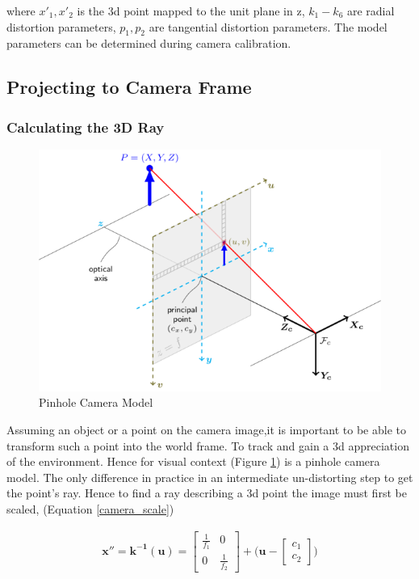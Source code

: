 \documentclass[a4paper,11pt,notitlepage]{article}
\begin{document}
where $x'_{1},x'_{2}$ is the 3d point mapped to the unit plane in z, $k_{1}-k_{6}$ are radial distortion parameters, $p_{1},p_{2}$ are tangential distortion parameters. The model parameters can be determined during camera calibration.

\subsection{Projecting to Camera Frame}

\subsubsection{Calculating the 3D Ray}

\noindent \begin{figure}[h!]
	\includegraphics[width = 1.0\hsize]{figures/pinhole_camera_model.png}
	\caption{Pinhole Camera Model}
	\label{pinhole_model}
\end{figure}

Assuming an object or a point on the camera image,it is important to be able to transform such a point into the world frame. To track and gain a 3d appreciation of the environment. Hence for visual context (Figure \ref{pinhole_model}) is a pinhole camera model. The only difference in practice in an intermediate un-distorting step to get the point's ray. Hence to find a ray describing a 3d point the image must first be scaled, (Equation \ref{camera_scale})


\begin{equation}
\begin{aligned}
\mathbf{x''} = \mathbf{k^{-1}(u)} = 
\begin{bmatrix}
\frac{1}{f_{1}} & 0 \\[0.3em]
0 & \frac{1}{f_{2}}
\end{bmatrix}
+ 
\bigg (
\mathbf{u} -
\begin{bmatrix}
c_{1} \\[0.3em]
c_{2}
\end{bmatrix}
\bigg )
\end{aligned}
\label{camera_scale}
\end{equation}
\end{document}
